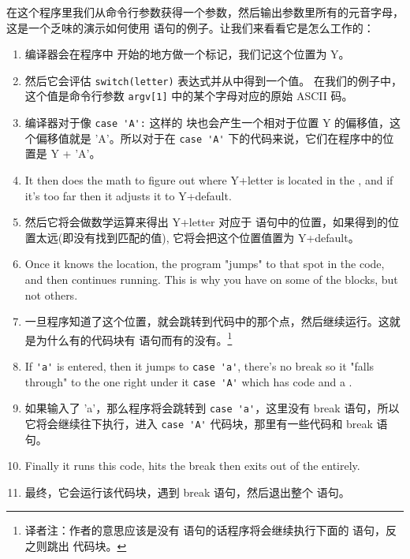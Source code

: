 在这个程序里我们从命令行参数获得一个参数，然后输出参数里所有的元音字母，这是一个乏味的演示如何使用  语句的例子。让我们来看看它是怎么工作的：
\begin{enumerate}

\item 编译器会在程序中 开始的地方做一个标记，我们记这个位置为 Y。
\item 然后它会评估 \verb|switch(letter)| 表达式并从中得到一个值。
在我们的例子中，这个值是命令行参数 \verb|argv[1]| 中的某个字母对应的原始 ASCII 码。
\item 编译器对于像 \verb|case 'A':| 这样的  块也会产生一个相对于位置 Y 的偏移值，这个偏移值就是 'A'。所以对于在 \verb|case 'A'| 下的代码来说，它们在程序中的位置是 Y + 'A'。
\item It then does the math to figure out where Y+letter is
    located in the , and if it's too
    far then it adjusts it to Y+default.
\item 然后它将会做数学运算来得出 Y+letter 对应于  语句中的位置，如果得到的位置太远(即没有找到匹配的值), 它将会把这个位置值置为 Y+default。
\item Once it knows the location, the program "jumps" to that spot
    in the code, and then continues running.  This is why you have
     on some of the  blocks, but not others.
\item 一旦程序知道了这个位置，就会跳转到代码中的那个点，然后继续运行。这就是为什么有的代码块有  语句而有的没有。\footnote{译者注：作者的意思应该是没有  语句的话程序将会继续执行下面的  语句，反之则跳出  代码块。}
\item If \verb|'a'| is entered, then it jumps to \verb|case 'a'|, there's
    no break so it "falls through" to the one right under it \verb|case 'A'|
    which has code and a .
\item 如果输入了 'a'，那么程序将会跳转到 \verb|case 'a'|，这里没有 break 语句，所以它将会继续往下执行，进入 \verb|case 'A'| 代码块，那里有一些代码和 break 语句。
\item Finally it runs this code, hits the break then exits out of the
     entirely.
\item 最终，它会运行该代码块，遇到 break 语句，然后退出整个  语句。
\end{enumerate}

